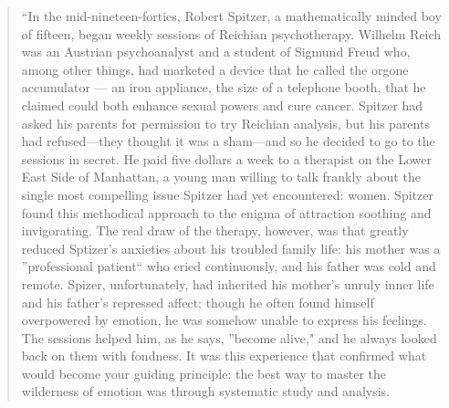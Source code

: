 \begin{refsection}
\begin{quote}
``In the mid-nineteen-forties, Robert Spitzer, a mathematically minded boy of fifteen, began weekly sessions of Reichian psychotherapy. Wilhelm Reich was an Austrian psychoanalyst and a student of Sigmund Freud who, among other things, had marketed a device that he called the orgone accumulator --- an iron appliance, the size of a telephone booth, that he claimed could both enhance sexual powers and cure cancer. Spitzer had asked his parents for permission to try Reichian analysis, but his parents had refused---they thought it was a sham---and so he decided to go to the sessions in secret. He paid five dollars a week to a therapist on the Lower East Side of Manhattan, a young man willing to talk frankly about the single most compelling issue Spitzer had yet encountered: women. Spitzer found this methodical approach to the enigma of attraction soothing and invigorating. The real draw of the therapy, however, was that greatly reduced Sptizer's anxieties about his troubled family life: his mother was a ''professional patient`` who cried continuously, and his father was cold and remote. Spizer, unfortunately, had inherited his mother's unruly inner life and his father's repressed affect; though he often found himself overpowered by emotion, he was somehow unable to express his feelings. The sessions helped him, as he says, ''become alive," and he always looked back on them with fondness. It was this experience that confirmed what would become your guiding principle: the best way to master the wilderness of emotion was through systematic study and analysis.


\end{quote}
\end{refsection}
